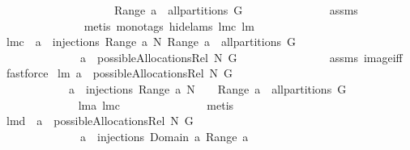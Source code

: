 \begin{isabellebody}
\ \ \ \ \ \ \ \ \ \ \ \ \ \ \ \ \ \ \ \ Range\ a\ {\isasymin}\ all{\isacharunderscore}partitions\ G{\isacharparenright}{\isachardoublequoteclose}\isanewline
%
\isadelimproof
\ \ \ \ \ \ \ \ \ \ \ \ \ %
\endisadelimproof
%
\isatagproof
{}\isamarkupfalse%
\ assms\ \isanewline
\ \ \ \ \ \ \ \ \ \ \ \ \ \isamarkupfalse%
\ {\isacharparenleft}metis\ {\isacharparenleft}mono{\isacharunderscore}tags{\isacharcomma}\ hide{\isacharunderscore}lams{\isacharparenright}\ lm{}{}c\ lm{}{}{\isacharparenright}%
\endisatagproof
{\isafoldproof}%
%
\isadelimproof
\isanewline
%
\endisadelimproof
\isanewline
{}\isamarkupfalse%
\ lm{}{}c{\isacharcolon}\ \ {\isachardoublequoteopen}a{\isacharcircum}{\isacharminus}{}\ {\isasymin}\ injections\ {\isacharparenleft}Range\ a{\isacharparenright}\ N{\isachardoublequoteclose}\ {\isachardoublequoteopen}Range\ a\ {\isasymin}\ all{\isacharunderscore}partitions\ G{\isachardoublequoteclose}\ \isanewline
\ \ \ \ \ \ \ \ \ \ \ \ \ \ {\isachardoublequoteopen}a\ {\isasymin}\ possibleAllocationsRel\ N\ G{\isachardoublequoteclose}\ \isanewline
%
\isadelimproof
\ \ \ \ \ \ \ \ \ \ \ \ \ %
\endisadelimproof
%
\isatagproof
{}\isamarkupfalse%
\ assms\ image{\isacharunderscore}iff\ \isamarkupfalse%
\ fastforce%
\endisatagproof
{\isafoldproof}%
%
\isadelimproof
\isanewline
%
\endisadelimproof
\isanewline
{}\isamarkupfalse%
\ lm{}{}{\isacharcolon}\ {\isachardoublequoteopen}a\ {\isasymin}\ possibleAllocationsRel\ N\ G\ {\isacharequal}\ \isanewline
\ \ \ \ \ \ \ \ \ \ \ \ {\isacharparenleft}a{\isacharcircum}{\isacharminus}{}\ {\isasymin}\ injections\ {\isacharparenleft}Range\ a{\isacharparenright}\ N\ \ {\isacharampersand}\ \ Range\ a\ {\isasymin}\ all{\isacharunderscore}partitions\ G{\isacharparenright}{\isachardoublequoteclose}\isanewline
%
\isadelimproof
\ \ \ \ \ \ \ \ \ \ \ \ %
\endisadelimproof
%
\isatagproof
{}\isamarkupfalse%
\ lm{}{}a\ lm{}{}c\ \isanewline
\ \ \ \ \ \ \ \ \ \ \ \ \isamarkupfalse%
\ metis%
\endisatagproof
{\isafoldproof}%
%
\isadelimproof
\isanewline
%
\endisadelimproof
\isanewline
{}\isamarkupfalse%
\ lm{}{}d{\isacharcolon}\ \ {\isachardoublequoteopen}a\ {\isasymin}\ possibleAllocationsRel\ N\ G{\isachardoublequoteclose}\ \isanewline
\ \ \ \ \ \ \ \ \ \ \ \ \ \ {\isachardoublequoteopen}a\ {\isasymin}\ injections\ {\isacharparenleft}Domain\ a{\isacharparenright}\ {\isacharparenleft}Range\ a{\isacharparenright}\ {\isacharampersand}\ \isanewline

\end{isabellebody}
